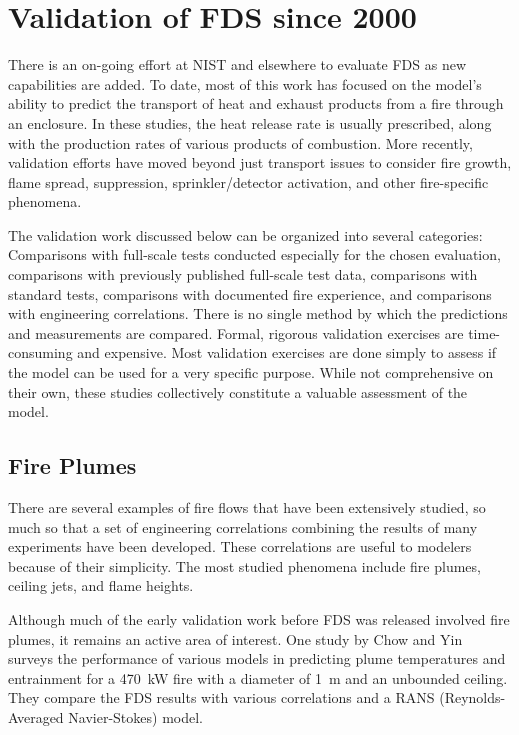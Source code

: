 \section{Validation of FDS since 2000}

There is an on-going effort at NIST and elsewhere to evaluate FDS as new capabilities are added. To date, most of this work has focused on the model's ability to predict the transport of heat and exhaust products from a fire through an enclosure. In these studies, the heat release rate is usually prescribed, along with the production rates of various products of combustion. More recently, validation efforts have moved beyond just transport issues to consider fire growth, flame spread, suppression, sprinkler/detector activation, and other fire-specific phenomena.

The validation work discussed below can be organized into several categories: Comparisons with full-scale tests conducted especially for the chosen evaluation,  comparisons  with previously  published full-scale test data, comparisons with standard tests, comparisons with documented fire experience, and comparisons with engineering correlations. There is no single method by which the predictions and measurements are compared.  Formal, rigorous validation exercises are time-consuming and expensive. Most validation exercises are done simply to assess if the model can be used for a very specific purpose. While not comprehensive on their own, these studies collectively constitute a valuable assessment of the model.


\subsection{Fire Plumes}

There are several examples of fire flows that have been extensively studied, so much so that a set of engineering correlations combining the results of  many experiments  have been  developed. These correlations are useful to modelers because of their simplicity. The most studied phenomena include fire plumes, ceiling jets, and flame heights.

Although much of the early validation work before FDS was released involved fire plumes, it remains an active area of interest. One study by Chow and Yin~\cite{Chow:1} surveys the performance of various models in predicting plume temperatures and entrainment for a 470~kW fire with a diameter of 1~m and an unbounded ceiling. They compare the FDS results with various correlations and a RANS (Reynolds-Averaged Navier-Stokes) model.

